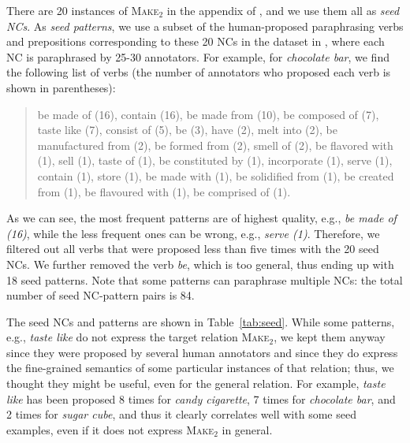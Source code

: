 \documentclass[letterpaper,11pt]{article}
\newcommand{\tabref}[2][]{Table#1~\ref{#2}\xspace}
\begin{document}
There  are  20  instances  of \textsc{Make$_2$}  in  the  appendix  of
\cite{Levi:1978},  and  we  use  them   all  as  \emph{seed  NCs}.  As
\emph{seed  patterns},   we  use   a  subset  of   the  human-proposed
paraphrasing verbs and  prepositions corresponding to these  20 NCs in
the dataset in \cite{Nakov:2008:AIMSA}, where each NC is paraphrased by
25-30 annotators. For  example, for \emph{chocolate bar},  we find the
following list  of verbs (the  number of annotators who  proposed each
verb is shown in parentheses):

\begin{quotation}
\begin{small}
\noindent be made of (16), contain (16), be made from (10), be composed of (7), taste like (7), consist of (5), be (3), have (2), melt into (2), be manufactured from (2), be formed from (2), smell of (2), be flavored with (1), sell (1), taste of (1), be constituted by (1), incorporate (1), serve (1), contain (1), store (1), be made with (1), be solidified from (1), be created from (1), be flavoured with (1), be comprised of (1).
\end{small}
\end{quotation}


As we can see, the most frequent patterns are of highest quality, e.g., \emph{be made of (16)},
while the less frequent ones can be wrong, e.g., \emph{serve (1)}.
Therefore, we filtered out all verbs that were proposed less than five
times with  the 20 seed  NCs. We  further removed the  verb \emph{be},
which is too general, thus ending  up with 18 seed patterns. Note that
some patterns  can paraphrase multiple  NCs: the total number  of seed
NC-pattern pairs is 84.

The seed NCs  and patterns are shown in  \tabref{tab:seed}. While some
patterns, e.g., \emph{taste  like} do not express  the target relation
\textsc{Make$_2$}, we  kept them  anyway since  they were  proposed by
several human  annotators and since  they do express  the fine-grained
semantics of some particular instances of that relation;
thus, we thought they might be useful, even for the general relation.
For  example,  \emph{taste  like}  has   been  proposed  8  times  for
\emph{candy cigarette}, 7 times for  \emph{chocolate bar}, and 2 times
for \emph{sugar cube},  and thus it clearly correlates  well with some
seed  examples,  even if  it  does  not express  \textsc{Make$_2$}  in
general.


\end{document}
